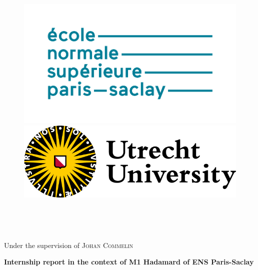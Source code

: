 \thispagestyle{plain}
\vspace*{\fill}
    \begin{center}
        \begin{figure}[!ht]
            \begin{minipage}{0.6\textwidth}
                \includegraphics[scale=0.20]{logo_ens_ps.png}
            \end{minipage}
            \begin{minipage}{0.4\textwidth}
                \includegraphics[scale=1]{logo_UU.png}
            \end{minipage}
        \end{figure}
    
        \makeatletter
        {\huge \textbf{\@title}}
        \\
        \medskip

    
        {\large \textsc{\@author}}
        \\
    
        \makeatother
    
        {
        \large Under the supervision of \textsc{Johan Commelin}\\}

    {\textbf{Internship report in the context of M1 Hadamard of ENS Paris-Saclay}}
  
    \end{center}



    \vspace*{\fill}

    \newpage
